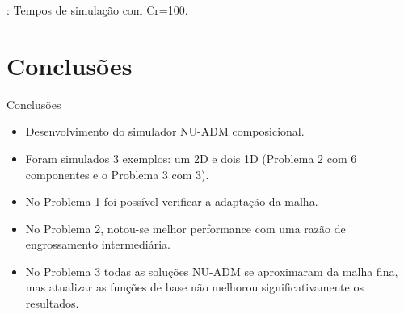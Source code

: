 \documentclass[professionalfont]{beamer}
\begin{document}
\begin{frame}{\FrameProblemName: {\small Tempos de simulação com Cr=100.}}
\begin{figure}[!h]
        \label{fig:fig9_pr2-cr100}
    \end{figure}
\end{frame}



\section{Conclusões}
\begin{frame}{Conclusões}

    \begin{itemize}
        \item Desenvolvimento do simulador NU-ADM composicional.
        \item Foram simulados 3 exemplos: um 2D e dois 1D (Problema 2 com 6 componentes e o Problema 3 com 3).
        \item No Problema 1 foi possível verificar a adaptação da malha.
        \item No Problema 2, notou-se melhor performance com uma razão de engrossamento intermediária.
        \item No Problema 3 todas as soluções NU-ADM se aproximaram da malha fina, mas atualizar as funções de base não melhorou significativamente os resultados.
    \end{itemize}


    
\end{frame}
\end{document}
